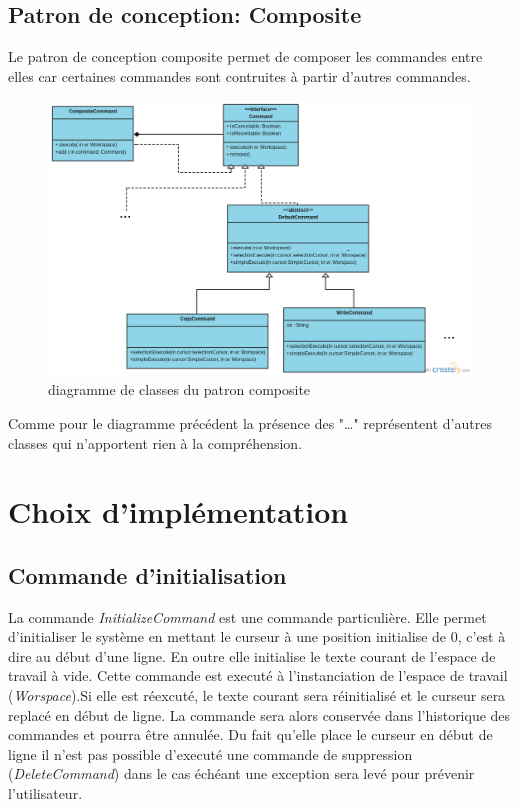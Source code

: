 \documentclass[pdftex,12pt,a4paper]{article}
\begin{document}
    \subsection{Patron de conception: Composite}
        Le patron de conception composite permet de composer les commandes entre elles car certaines commandes sont contruites à partir d'autres commandes. 
   		\begin{figure}[htb]
        	\begin{center}
        	\includegraphics[width=1.1\textwidth]{./CompositeGl.png}\caption{diagramme de classes du patron composite}
             \end{center}
      	\end{figure}
        
Comme pour le diagramme précédent la présence des "\dots" représentent d'autres classes qui n'apportent rien à la compréhension.
 
       \newpage
      \section{Choix d'implémentation}
      
 	\subsection{Commande d'initialisation}
       La commande \emph{InitializeCommand} est une commande particulière. Elle permet d'initialiser  le système en mettant le curseur à une position initialise de 0, c'est à dire au début d'une ligne. En outre elle initialise le texte courant de l'espace de travail à vide. Cette commande est executé à l'instanciation de l'espace de travail (\emph{Worspace}).Si elle est réexcuté, le texte courant sera réinitialisé et le curseur sera replacé en début de ligne. La commande sera alors conservée dans l'historique des commandes et pourra être annulée. Du fait qu'elle place le curseur en début de ligne il n'est pas possible d'executé une commande de suppression (\emph{DeleteCommand}) dans le cas échéant une exception sera levé pour prévenir l'utilisateur.
        
\end{document}
